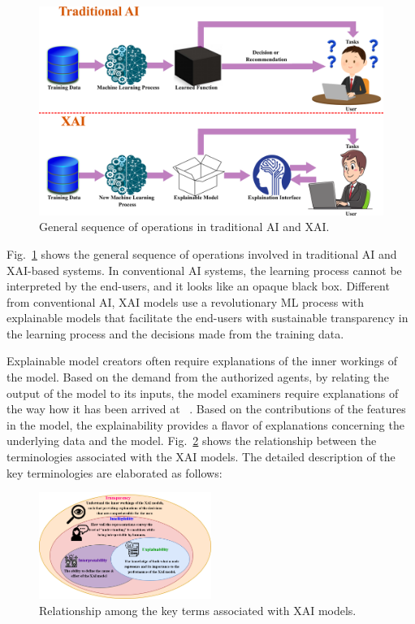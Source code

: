 \documentclass[journal]{IEEEtran}
\begin{document}
\begin{figure}
  \centering \includegraphics[width=\textwidth]{figures/AIXAI.png}
   \caption{General sequence of operations in traditional AI and XAI.}
   \label{fig:AIXAI}
\end{figure}

Fig.~\ref{fig:AIXAI} shows the general sequence of operations involved in traditional AI and XAI-based systems. In conventional AI systems, the learning process cannot be interpreted by the end-users, and it looks like an opaque black box. Different from conventional AI, XAI models use a revolutionary ML process with explainable models that facilitate the end-users with sustainable transparency in the learning process and the decisions made from the training data. 

Explainable model creators often require explanations of the inner workings of the model. Based on the demand from the authorized agents, by relating the output of the model to its inputs, the model examiners require explanations of the way how it has been arrived at ~\cite{meske2021explainable}. Based on the contributions of the features in the model, the explainability provides a flavor of explanations concerning the underlying data and the model. Fig.~\ref{fig:Expterms} shows the relationship between the terminologies associated with the XAI models. The detailed description of the key terminologies are elaborated as follows: 

\begin{figure}
  \centering \includegraphics[width=0.5\textwidth]{figures/Explainability.png}
   \caption{Relationship among the key terms associated with XAI models.}
   \label{fig:Expterms}
\end{figure}
\end{document}
